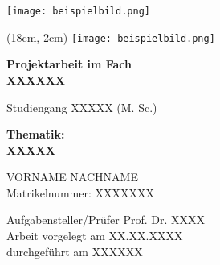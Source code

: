 \thispagestyle{empty}

\vspace*{-20mm}
\begin{center}
   \texttt{[image: beispielbild.png]}
\end{center}
\vspace*{2cm}
\begin{textblock*}{80pt}(18cm, 2cm)  %
	\texttt{[image: beispielbild.png]}
\end{textblock*}

\begin{center}
{\Large \bfseries Projektarbeit im Fach\\} 
{\Large \bfseries \glqq XXXXXX\grqq \\} 

\vspace*{1cm}

{\large Studiengang XXXXX (M. Sc.)\\[1mm]}

\vspace{1cm}

{\Large \bfseries Thematik:\\}
{\Large \bfseries XXXXX \\}


\vspace{1.5cm}

{\large VORNAME NACHNAME}\\[5mm]
{\large Matrikelnummer: XXXXXXX}\\[10mm]

\end{center}
\vfill

\begin{center}
\parbox{120mm}{
\begin{tabbing}
Aufgabensteller/Prüfer \hspace{.7cm} \=  Prof. Dr. XXXX\\
Arbeit vorgelegt am                  \> XX.XX.XXXX \\
durchgeführt am                  \> XXXXXX\\[4mm]
\end{tabbing}
}
\end{center}


